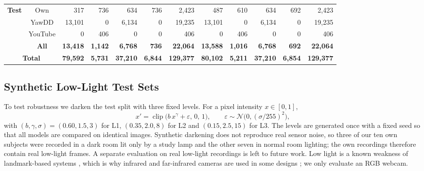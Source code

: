 \documentclass[conference]{IEEEtran}
\begin{document}
\begin{table}[!t]
{\begin{tabular}{|c|c||r|r|r|r|r||r|r|r|r|r|}
\multirow{4}{*}{\textbf{Test}}
& Own
& 317 & 736 & 634 & 736 & 2,423
& 487 & 610 & 634 & 692 & 2,423 \\

& YawDD
& 13,101 & 0 & 6,134 & 0 & 19,235
& 13,101 & 0 & 6,134 & 0 & 19,235 \\

& YouTube
& 0 & 406 & 0 & 0 & 406
& 0 & 406 & 0 & 0 & 406 \\

& \textbf{All}
& \textbf{13,418} & \textbf{1,142} & \textbf{6,768} & \textbf{736} & \textbf{22,064}
& \textbf{13,588} & \textbf{1,016} & \textbf{6,768} & \textbf{692} & \textbf{22,064} \\

\hline

\multicolumn{2}{|c|}{\textbf{Total}}
& \textbf{79,592} & \textbf{5,731} & \textbf{37,210} & \textbf{6,844} & \textbf{129,377}
& \textbf{80,102} & \textbf{5,211} & \textbf{37,210} & \textbf{6,854} & \textbf{129,377} \\

\hline
\end{tabular}%
}
\end{table}


\subsection{Synthetic Low-Light Test Sets}\label{sec:lowlight}
To test robustness we darken the test split with three fixed levels. For a pixel intensity $x\in[0,1]$,
\begin{equation}
x' = \operatorname{clip}\!\bigl(b\,x^{\gamma} + \varepsilon,\,0,\,1\bigr),\qquad \varepsilon\sim\mathcal{N}\!\bigl(0,(\sigma/255)^2\bigr),
\label{eq:lowlight}
\end{equation}
with $(b,\gamma,\sigma)=(0.60,1.5,3)$ for L1, $(0.35,2.0,8)$ for L2 and $(0.15,2.5,15)$ for L3. The levels are generated once with a fixed seed so that all models are compared on identical images. Synthetic darkening does not reproduce real sensor noise, so three of our ten own subjects were recorded in a dark room lit only by a study lamp and the other seven in normal room lighting; the own recordings therefore contain real low-light frames. A separate evaluation on real low-light recordings is left to future work. Low light is a known weakness of landmark-based systems \cite{rao2024}, which is why infrared and far-infrared cameras are used in some designs \cite{kim2023, knapik2024}; we only evaluate an RGB webcam.
\end{document}
